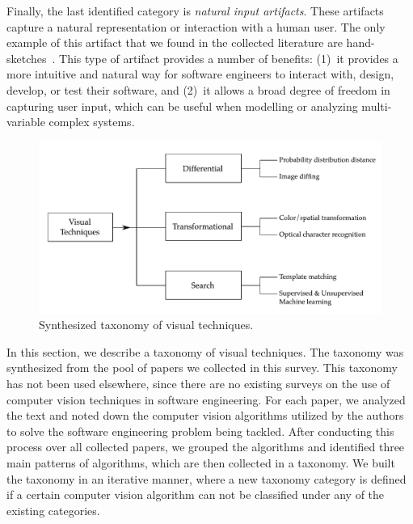 Finally, 
the last identified category is \emph{natural input artifacts}.
These artifacts capture a natural representation or interaction with a human user.
The only example of this artifact that we found in the collected literature are
hand-sketches~\cite{Scharf-2013-ICSE, Reiss-2018-ASEj}.
This type of artifact provides a number of benefits:
(1)~it provides a more intuitive and natural way for software engineers to interact with,
    design, develop, or test their software, and
(2)~it allows a broad degree of freedom in capturing user input,
    which can be useful when modelling or analyzing multi-variable complex systems.






\begin{figure}
    \centering
    \includegraphics[width=\linewidth]{survey/figures/taxonomy}
    \caption{Synthesized taxonomy of visual techniques.}
    \label{fig:taxonomy-rq3}
\end{figure}

In this section, we describe a taxonomy of visual techniques.
The taxonomy was synthesized from the pool of papers we collected 
in this survey. 
This taxonomy has not been used elsewhere, since 
there are no existing surveys on the use of computer 
vision techniques in software engineering.
For each paper, we analyzed the text and 
noted down the computer vision algorithms utilized by the authors 
to solve the software engineering problem being tackled.
After conducting this process over all collected papers, 
we grouped the algorithms and identified three main patterns of algorithms,
which are then collected in a taxonomy.
We built the taxonomy in an iterative manner,
where a new taxonomy category is defined if a certain computer vision algorithm 
can not be classified under any of the existing categories.

